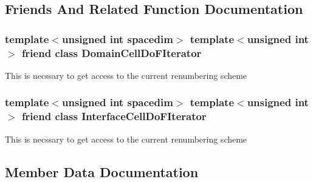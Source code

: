 \subsection{Friends And Related Function Documentation}
\subsubsection[{\texorpdfstring{Domain\+Cell\+Do\+F\+Iterator}{DomainCellDoFIterator}}]{\setlength{\rightskip}{0pt plus 5cm}template$<$unsigned int spacedim$>$ template$<$unsigned int$>$ friend class {\bf Domain\+Cell\+Do\+F\+Iterator}\hspace{0.3cm}{\ttfamily [friend]}}\hypertarget{class_do_f_handler_system_a22fa60ad60906aacbbe21d3b5704ebfc}{}\label{class_do_f_handler_system_a22fa60ad60906aacbbe21d3b5704ebfc}
This is necssary to get access to the current renumbering scheme 
\subsubsection[{\texorpdfstring{Interface\+Cell\+Do\+F\+Iterator}{InterfaceCellDoFIterator}}]{\setlength{\rightskip}{0pt plus 5cm}template$<$unsigned int spacedim$>$ template$<$unsigned int$>$ friend class {\bf Interface\+Cell\+Do\+F\+Iterator}\hspace{0.3cm}{\ttfamily [friend]}}\hypertarget{class_do_f_handler_system_a266cb42b2fa4af49d4df0d938f962749}{}\label{class_do_f_handler_system_a266cb42b2fa4af49d4df0d938f962749}
This is necssary to get access to the current renumbering scheme 

\subsection{Member Data Documentation}
